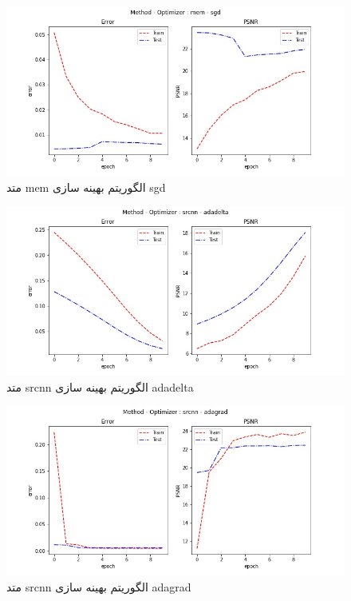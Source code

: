  \begin{figure}[!h] 
       \centering 
       \includegraphics[width=160mm]{./chapter3/images/error-psnr-mem-sgd.jpg}
       \caption{متد mem الگوریتم بهینه سازی sgd}
       \label{fig:error-psnr-mem-sgd}
 \end{figure}
 \begin{figure}[!h] 
       \centering 
       \includegraphics[width=160mm]{./chapter3/images/error-psnr-srcnn-adadelta.jpg}
       \caption{متد srcnn الگوریتم بهینه سازی adadelta}
       \label{fig:error-psnr-srcnn-adadelta}
 \end{figure}
 \begin{figure}[!h] 
       \centering 
       \includegraphics[width=160mm]{./chapter3/images/error-psnr-srcnn-adagrad.jpg}
       \caption{متد srcnn الگوریتم بهینه سازی adagrad}
       \label{fig:error-psnr-srcnn-adagrad}
 \end{figure}
